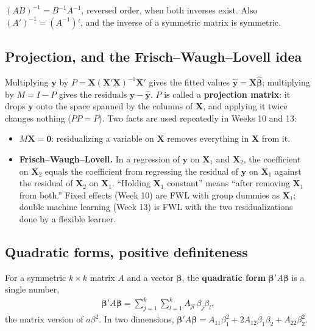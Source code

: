 \documentclass[11pt]{article}
\theoremstyle{definition}
\newcommand{\X}{\bm{X}}
\newcommand{\Y}{\bm{y}}
\newcommand{\bbeta}{\bm{\beta}}
\newcommand{\bhat}{\hat{\bm{\beta}}}
\begin{document}
\begin{rulebox}
$(AB)^{-1} = B^{-1}A^{-1}$, reversed order, when both inverses exist. Also
$(A')^{-1} = (A^{-1})'$, and the inverse of a symmetric matrix is
symmetric.
\end{rulebox}

\subsection{Projection, and the Frisch--Waugh--Lovell idea}
\label{sec:projection}

Multiplying $\Y$ by $P = \X(\X'\X)^{-1}\X'$ gives the fitted values
$\hat{\Y} = \X\bhat$; multiplying by $M = I - P$ gives the residuals
$\Y - \hat{\Y}$. $P$ is called a \textbf{projection matrix}: it drops $\Y$
onto the space spanned by the columns of $\X$, and applying it twice
changes nothing ($PP = P$). Two facts are used repeatedly in Weeks 10 and
13:
\begin{itemize}
  \item $M\X = \bm 0$: residualizing a variable on $\X$ removes everything
        in $\X$ from it.
  \item \textbf{Frisch--Waugh--Lovell.} In a regression of $\Y$ on
        $\X_1$ and $\X_2$, the coefficient on $\X_2$ equals the coefficient
        from regressing the residual of $\Y$ on $\X_1$ against the residual
        of $\X_2$ on $\X_1$. ``Holding $\X_1$ constant'' means ``after
        removing $\X_1$ from both.'' Fixed effects (Week 10) are FWL with
        group dummies as $\X_1$; double machine learning (Week 13) is FWL
        with the two residualizations done by a flexible learner.
\end{itemize}

\subsection{Quadratic forms, positive definiteness}
\label{sec:quad}

For a symmetric $k \times k$ matrix $A$ and a vector $\bbeta$, the
\textbf{quadratic form} $\bbeta'A\bbeta$ is a single number,
\begin{align*}
  \bbeta'A\bbeta = \sum_{j=1}^{k}\sum_{l=1}^{k} A_{jl}\,\beta_j\beta_l ,
\end{align*}
the matrix version of $a\beta^2$. In two dimensions,
$\bbeta'A\bbeta = A_{11}\beta_1^2 + 2A_{12}\beta_1\beta_2 + A_{22}\beta_2^2$.
\end{document}
